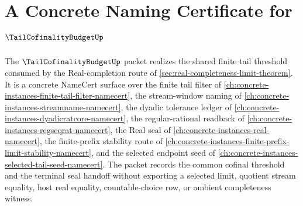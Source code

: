 \chapter{A Concrete Naming Certificate for $\TailCofinalityBudgetUp$}
\label{ch:concrete-instances-tail-cofinality-budget-namecert}

The $\TailCofinalityBudgetUp$ packet realizes the shared finite tail threshold consumed by the Real-completion route of \autoref{sec:real-completeness-limit-theorem}. It is a concrete NameCert surface over the finite tail filter of \autoref{ch:concrete-instances-finite-tail-filter-namecert}, the stream-window naming of \autoref{ch:concrete-instances-streamname-namecert}, the dyadic tolerance ledger of \autoref{ch:concrete-instances-dyadicratcore-namecert}, the regular-rational readback of \autoref{ch:concrete-instances-regseqrat-namecert}, the Real seal of \autoref{ch:concrete-instances-real-namecert}, the finite-prefix stability route of \autoref{ch:concrete-instances-finite-prefix-limit-stability-namecert}, and the selected endpoint seed of \autoref{ch:concrete-instances-selected-tail-seed-namecert}. The packet records the common cofinal threshold and the terminal seal handoff without exporting a selected limit, quotient stream equality, host real equality, countable-choice row, or ambient completeness witness.



